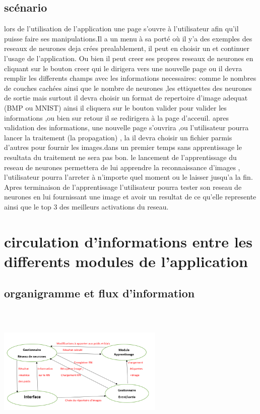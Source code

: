 \documentclass{article}
\begin{document}
	\subsection{scénario}
			lors de l'utilisation de l'application une page s'ouvre à l'utilisateur afin qu'il puisse faire ses manipulations.Il a un menu à sa porté où il y'a des exemples des reseaux de neurones deja crées prealablement, il peut en choisir un et continuer l'usage de l'application.
Ou bien il peut creer ses propres reseaux de neurones en cliquant sur le bouton creer qui le dirigera vers une nouvelle page ou il devra remplir les differents champs avec les informations necessaires: comme le nombres de couches cachées ainsi que le nombre de neurones ,les ettiquettes des neurones de sortie 
mais surtout il devra choisir un format de repertoire d'image adequat (BMP ou MNIST) ainsi il cliquera sur le bouton valider pour valider les informations ,ou bien sur retour il se redirigera à la page d'acceuil.
 apres validation des informations, une nouvelle page s'ouvrira ,ou l'utilisateur pourra lancer la traitement (la propagation) , la il devra choisir un fichier parmis d'autres pour fournir les images.dans un premier temps sans apprentissage le resultata du traitement ne sera pas bon.
 le lancement de l'apprentissage du reseau de neurones permettera de lui apprendre la reconnaissance d'images , l'utilisateur pourra l'arreter à n'importe quel moment ou le laisser jusqu'a la fin.
 Apres terminaison de l'apprentissage l'utilisateur pourra tester son reseau de neurones en lui fournissant une image et avoir un resultat de ce qu'elle represente ainsi que le top 3 des meilleurs activations du reseau. 
	\newpage

\section{circulation d'informations entre les differents modules de l'application}
	\subsection{organigramme et flux d'information}
		\begin{center} 

			\includegraphics[height=244, width=300]{pic-min.PNG}

		\end{center}	
\end{document}
